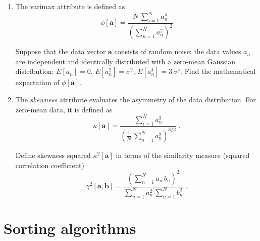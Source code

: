 \begin{enumerate}

\item The varimax attribute is defined as
\begin{equation}
  \label{eq:varimax}
\phi[\mathbf{a}] = \frac{\displaystyle N\,\sum\limits_{i=1}^N
  a_n^4}{\displaystyle \left(\sum\limits_{n=1}^{N} a_n^2\right)^2}
\end{equation}

Suppose that the data vector $\mathbf{a}$ consists of random noise:
the data values $a_n$ are independent and identically distributed with
a zero-mean Gaussian distribution: $E[a_n]=0$, $E[a_n^2]=\sigma^2$,
$E[a_n^4]=3\,\sigma^4$. Find the mathematical expectation of
$\phi[\mathbf{a}]$.

\item The \emph{skewness} attribute evaluates the asymmetry of the data
  distribution. For zero-mean data, it is defined as
\begin{equation}
  \label{eq:skewness}
\kappa[\mathbf{a}] = \frac{\sum\limits_{i=1}^N
  a_n^3}{\displaystyle \left(\frac{1}{N}\,\sum\limits_{n=1}^{N} a_n^2\right)^{3/2}}\;.
\end{equation}

Define skewness squared $\kappa^2[\mathbf{a}]$ in terms of the similarity
measure (squared correlation coefficient) 
\begin{equation}
\label{eq:gamma}
\gamma^2[\mathbf{a},\mathbf{b}] = 
\frac{\displaystyle \left(\sum\limits_{n=1}^N a_n\,b_n\right)^2}{\displaystyle \sum\limits_{n=1}^N a_n^2\,\sum\limits_{n=1}^N b_n^2}\;.
\end{equation}

\end{enumerate}

\section{Sorting algorithms}

